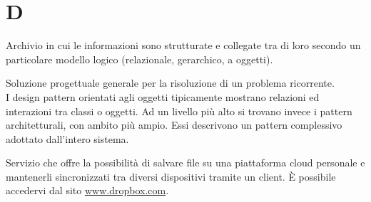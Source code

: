 \section{D}

Archivio in cui le informazioni sono strutturate e collegate tra di loro secondo un particolare modello logico (relazionale, gerarchico, a oggetti).

Soluzione progettuale generale per la risoluzione di un problema ricorrente. \\

I design pattern orientati agli oggetti tipicamente mostrano relazioni ed interazioni tra classi o oggetti. 
Ad un livello più alto si trovano invece i pattern architetturali, con ambito più ampio. Essi descrivono un pattern complessivo adottato dall'intero sistema.

Servizio che offre la possibilità di salvare file su una piattaforma cloud personale e
mantenerli sincronizzati tra diversi dispositivi tramite un client. È possibile accedervi dal sito \href{http://www.dropbox.com}{www.dropbox.com}.
